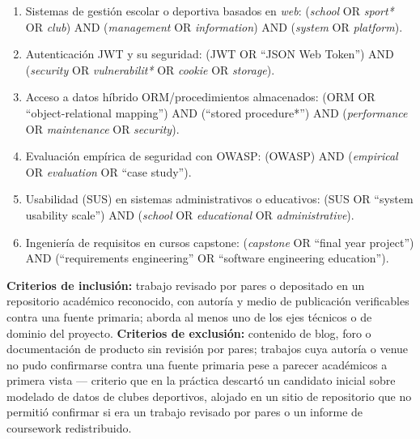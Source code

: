 \documentclass[11pt,a4paper]{article}
\begin{document}
\begin{enumerate}[leftmargin=*, itemsep=2pt]
  \item Sistemas de gestión escolar o deportiva basados en \emph{web}:
    (\emph{school} OR \emph{sport*} OR \emph{club}) AND (\emph{management}
    OR \emph{information}) AND (\emph{system} OR \emph{platform}).
  \item Autenticación JWT y su seguridad: (JWT OR ``JSON Web Token'') AND
    (\emph{security} OR \emph{vulnerabilit*} OR \emph{cookie} OR
    \emph{storage}).
  \item Acceso a datos híbrido ORM/procedimientos almacenados: (ORM OR
    ``object-relational mapping'') AND (``stored procedure*'') AND
    (\emph{performance} OR \emph{maintenance} OR \emph{security}).
  \item Evaluación empírica de seguridad con OWASP: (OWASP) AND
    (\emph{empirical} OR \emph{evaluation} OR ``case study'').
  \item Usabilidad (SUS) en sistemas administrativos o educativos: (SUS OR
    ``system usability scale'') AND (\emph{school} OR \emph{educational}
    OR \emph{administrative}).
  \item Ingeniería de requisitos en cursos capstone: (\emph{capstone} OR
    ``final year project'') AND (``requirements engineering'' OR
    ``software engineering education'').
\end{enumerate}

\textbf{Criterios de inclusión:} trabajo revisado por pares o depositado
en un repositorio académico reconocido, con autoría y medio de
publicación verificables contra una fuente primaria; aborda al menos uno
de los ejes técnicos o de dominio del proyecto. \textbf{Criterios de
exclusión:} contenido de blog, foro o documentación de producto sin
revisión por pares; trabajos cuya autoría o venue no pudo confirmarse
contra una fuente primaria pese a parecer académicos a primera vista —
criterio que en la práctica descartó un candidato inicial sobre
modelado de datos de clubes deportivos, alojado en un sitio de
repositorio que no permitió confirmar si era un trabajo revisado por
pares o un informe de coursework redistribuido.
\end{document}
